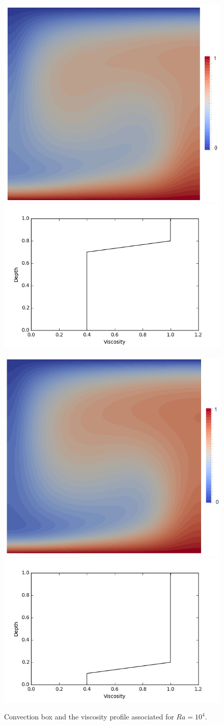 \documentclass{article}
\begin{document}
\begin{figure}
    \begin{center}
    \includegraphics[width=0.3\linewidth]{cookbooks/convection-box/viscosityjumpmodif.png}
    \includegraphics[width=0.25\linewidth]{cookbooks/convection-box/viscosityjumpprofile.png}
    
    \includegraphics[width=0.3\linewidth]{cookbooks/convection-box/viscosityjumplowmodif.png}
    \includegraphics[width=0.25\linewidth]{cookbooks/convection-box/viscosityjumplowprofile.png}
    \caption{Convection box and the viscosity profile associated for $Ra=10^4$.}
    \label{viscosityjump}
       \end{center}
\end{figure}
\end{document}
